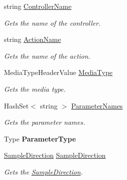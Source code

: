 \begin{DoxyCompactItemize}
\item 
string \hyperlink{class_wis_r_rest_a_p_i_1_1_areas_1_1_help_page_1_1_help_page_sample_key_a8b5f8df70561ef1b938918bfad55df4a}{Controller\+Name}
\begin{DoxyCompactList}\small\item\em Gets the name of the controller. \end{DoxyCompactList}\item 
string \hyperlink{class_wis_r_rest_a_p_i_1_1_areas_1_1_help_page_1_1_help_page_sample_key_a9912006f941b0c53203adaabe7101d7f}{Action\+Name}
\begin{DoxyCompactList}\small\item\em Gets the name of the action. \end{DoxyCompactList}\item 
Media\+Type\+Header\+Value \hyperlink{class_wis_r_rest_a_p_i_1_1_areas_1_1_help_page_1_1_help_page_sample_key_a6fd344e923164c651efbd3d1050fe035}{Media\+Type}
\begin{DoxyCompactList}\small\item\em Gets the media type. \end{DoxyCompactList}\item 
Hash\+Set$<$ string $>$ \hyperlink{class_wis_r_rest_a_p_i_1_1_areas_1_1_help_page_1_1_help_page_sample_key_a2cde26129e19cbacc6ad2c63809c5c15}{Parameter\+Names}
\begin{DoxyCompactList}\small\item\em Gets the parameter names. \end{DoxyCompactList}\item 
\hypertarget{class_wis_r_rest_a_p_i_1_1_areas_1_1_help_page_1_1_help_page_sample_key_a727be36f851058d2ec095bfcbda9ce5c}{}Type {\bfseries Parameter\+Type}\label{class_wis_r_rest_a_p_i_1_1_areas_1_1_help_page_1_1_help_page_sample_key_a727be36f851058d2ec095bfcbda9ce5c}

\item 
\hyperlink{namespace_wis_r_rest_a_p_i_1_1_areas_1_1_help_page_a5e9118cc1fa882599364690b402f67c7}{Sample\+Direction} \hyperlink{class_wis_r_rest_a_p_i_1_1_areas_1_1_help_page_1_1_help_page_sample_key_a00e600712288edbcdf0a2930704b7534}{Sample\+Direction}
\begin{DoxyCompactList}\small\item\em Gets the \hyperlink{class_wis_r_rest_a_p_i_1_1_areas_1_1_help_page_1_1_help_page_sample_key_a00e600712288edbcdf0a2930704b7534}{Sample\+Direction}. \end{DoxyCompactList}\end{DoxyCompactItemize}


